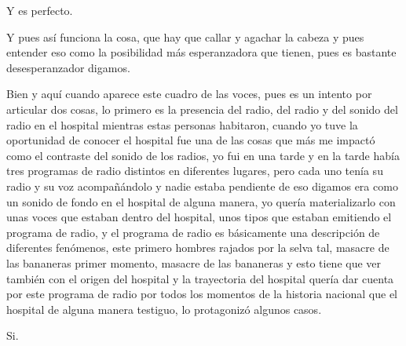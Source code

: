 Y es perfecto.

Y pues así funciona la cosa, que hay que callar y agachar la cabeza y pues entender eso como la posibilidad más esperanzadora que tienen, pues es bastante desesperanzador digamos.

Bien y aquí cuando aparece este cuadro de las voces, pues es un intento por articular dos cosas, lo primero es la presencia del radio, del radio y del sonido del radio en el hospital mientras estas personas habitaron, cuando yo tuve la oportunidad de conocer el hospital fue una de las cosas que más me impactó como el contraste del sonido de los radios, yo fui en una tarde y en la tarde había tres programas de radio distintos en diferentes lugares, pero cada uno tenía su radio y su voz acompañándolo y nadie estaba pendiente de eso digamos era como un sonido de fondo en el hospital de alguna manera, yo quería materializarlo con unas voces que estaban dentro del hospital, unos tipos que estaban emitiendo el programa de radio, y el programa de radio es básicamente una descripción de diferentes fenómenos, este primero hombres rajados por la selva tal, masacre de las bananeras primer momento, masacre de las bananeras y esto tiene que ver también con el origen del hospital y la trayectoria del hospital quería dar cuenta por este programa de radio por todos los momentos de la historia nacional que el hospital de alguna manera testiguo, lo protagonizó algunos casos.

Si.

